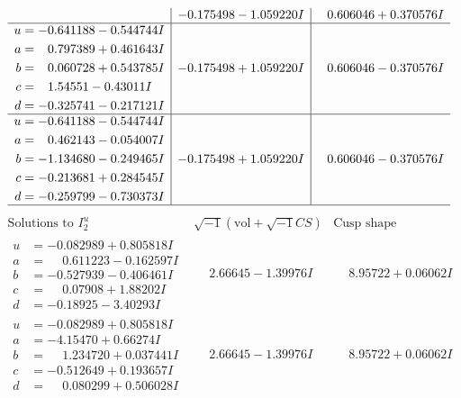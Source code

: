 \documentclass[1p]{elsarticle_modified}
\theoremstyle{definition}
\newcommand{\I}{\sqrt{-1}}
\begin{document}
$$\begin{array}{c|c|c}
 & -0.175498 - 1.059220 I & \phantom{-}0.606046 + 0.370576 I \\ \hline\begin{aligned}
u &= -0.641188 - 0.544744 I \\
a &= \phantom{-}0.797389 + 0.461643 I \\
b &= \phantom{-}0.060728 + 0.543785 I \\
c &= \phantom{-}1.54551 - 0.43011 I \\
d &= -0.325741 - 0.217121 I\end{aligned}
 & -0.175498 + 1.059220 I & \phantom{-}0.606046 - 0.370576 I \\ \hline\begin{aligned}
u &= -0.641188 - 0.544744 I \\
a &= \phantom{-}0.462143 - 0.054007 I \\
b &= -1.134680 - 0.249465 I \\
c &= -0.213681 + 0.284545 I \\
d &= -0.259799 - 0.730373 I\end{aligned}
 & -0.175498 + 1.059220 I & \phantom{-}0.606046 - 0.370576 I\\
 \hline 
 \end{array}$$\newpage$$\begin{array}{c|c|c}  
\text{Solutions to }I^u_{2}& \I (\text{vol} + \sqrt{-1}CS) & \text{Cusp shape}\\
 \hline 
\begin{aligned}
u &= -0.082989 + 0.805818 I \\
a &= \phantom{-}0.611223 - 0.162597 I \\
b &= -0.527939 - 0.406461 I \\
c &= \phantom{-}0.07908 + 1.88202 I \\
d &= -0.18925 - 3.40293 I\end{aligned}
 & \phantom{-}2.66645 - 1.39976 I & \phantom{-}8.95722 + 0.06062 I \\ \hline\begin{aligned}
u &= -0.082989 + 0.805818 I \\
a &= -4.15470 + 0.66274 I \\
b &= \phantom{-}1.234720 + 0.037441 I \\
c &= -0.512649 + 0.193657 I \\
d &= \phantom{-}0.080299 + 0.506028 I\end{aligned}
 & \phantom{-}2.66645 - 1.39976 I & \phantom{-}8.95722 + 0.06062 I \\ \hline\begin{aligned}

\end{aligned}
\end{array}$$
\end{document}
